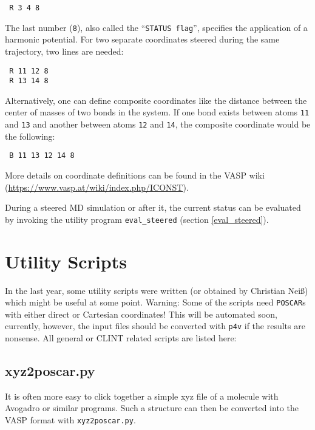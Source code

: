 \documentclass[a4paper,11pt]{article}
\begin{document}
\begin{verbatim}
 R 3 4 8
\end{verbatim}

The last number (\texttt{8}), also called the ``\texttt{STATUS flag}'', specifies the application of a harmonic potential.
For two separate coordinates steered during the same trajectory, two lines are needed:

\begin{verbatim}
 R 11 12 8
 R 13 14 8
\end{verbatim}

Alternatively, one can define composite coordinates like the distance between the center of masses of two bonds
in the system.
If one bond exists between atoms \texttt{11} and \texttt{13} and another between atoms \texttt{12} and \texttt{14},
the composite coordinate would be the following:

\begin{verbatim}
 B 11 13 12 14 8
\end{verbatim}

More details on coordinate definitions can be found in the VASP wiki (\url{https://www.vasp.at/wiki/index.php/ICONST}).

During a steered MD simulation or after it, the current status can be evaluated by invoking the utility
program \texttt{eval\_steered} (section \ref{eval_steered}).


\section{Utility Scripts}

In the last year, some utility scripts were written (or obtained by Christian Neiß) which might be useful at
some point. 
Warning: Some of the scripts need \texttt{POSCAR}s with either direct or Cartesian
coordinates! This will be automated soon, currently, however, the input files 
should be converted with \texttt{p4v} if the results are nonsense.
All general or CLINT related scripts are listed here:

\subsection{xyz2poscar.py}\label{xyz2poscar}

It is often more easy to click together a simple xyz file of a molecule
with Avogadro or similar 
programs. Such a structure can then be converted into the VASP format with 
\texttt{xyz2poscar.py}.
\end{document}
